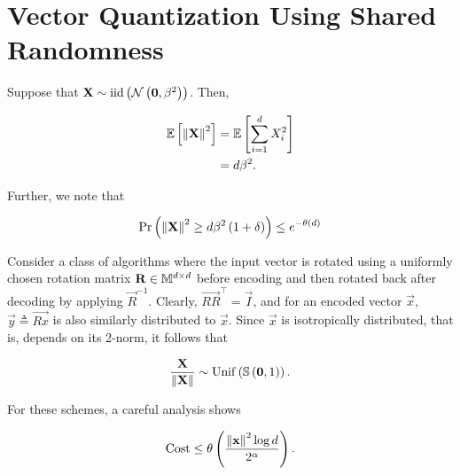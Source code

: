 \documentclass[twoside]{article}
\begin{document}



\section{Vector Quantization Using Shared Randomness}

Suppose that \(\boldsymbol{\mathbf{X}} \sim \mathrm{iid}\left(\mathcal N\left(\boldsymbol{\mathbf{0}},\beta^2\right)\right)\).
Then,

\begin{align}
    \mathbb{E}\left[ \left\lVert\boldsymbol{\mathbf{X}}\right\rVert^2 \right] &= \mathbb{E}\left[ \sum_{i=1}^dX_i^2 \right] \\
                            &= d\beta^2.
                            \label{eq:exp2-norm}
\end{align}

Further, we note that

\begin{equation}
    \Pr\left(\left\lVert\boldsymbol{\mathbf{X}}\right\rVert^2 \ge d\beta^2\left(1+\delta\right)\right) \le e^{-\theta\left(d\right)}
    \label{eq:exp-conc-ineq}
\end{equation}

Consider a class of algorithms where the input vector is rotated using a 
uniformly chosen rotation matrix \(\boldsymbol{\mathbf{R}}\in\mathbb M^{d\times d}\) before encoding 
and then rotated back after decoding by applying \(\vec{R}^{-1}\). Clearly, 
\(\vec{RR}^\top = \vec{I}\), and for an encoded vector \(\vec{x}\), \(\vec{y} 
\triangleq \vec{Rx}\) is also similarly distributed to \(\vec{x}\). Since 
\(\vec{x}\) is isotropically distributed, that is, depends on its 2-norm, it 
follows that

\begin{equation}
    \frac{\boldsymbol{\mathbf{X}}}{\left\lVert\boldsymbol{\mathbf{X}}\right\rVert} \sim \mathrm{Unif}\left(\mathbb S\left(\boldsymbol{\mathbf{0}},1\right)\right).
    \label{eq:unif-x-by-norm}
\end{equation}

For these schemes, a careful analysis shows

\begin{equation}
    \mathrm{Cost} \le \theta\left(\frac{\left\lVert\boldsymbol{\mathbf{x}}\right\rVert^2\log{d}}{2^\alpha}\right).
    \label{eq:cost-rot}
\end{equation}
\end{document}

